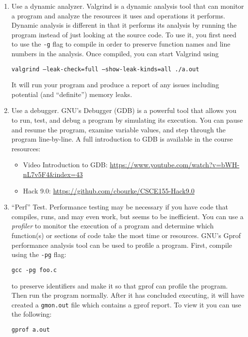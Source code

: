 \documentclass[12pt]{scrartcl}
\begin{document}
\begin{enumerate}
\begin{itemize}
  \end{itemize}
  
  \item Use a dynamic analyzer.  Valgrind is a dynamic analysis tool 
  that can monitor a program and analyze the resources it uses and
  operations it performs.  Dynamic analysis is different in that it
  performs its analysis by running the program instead of just looking
  at the source code.  To use it, you first need to use the 
  \texttt{-g} flag to compile in order to preserve function
  names and line numbers in the analysis.  Once compiled, you can start
  Valgrind using
  
  \texttt{valgrind --leak-check=full --show-leak-kinds=all ./a.out}

  It will run your program and produce a report of any issues including
  potential (and ``definite'') memory leaks.

  \item Use a debugger.  GNU's Debugger (GDB) is a powerful tool that
  allows you to run, test, and debug a program by simulating its execution.
  You can pause and resume the program, examine variable values, and
  step through the program line-by-line.  A full introduction to GDB
  is available in the course resources:
  \begin{itemize}
    \item Video Introduction to GDB: \url{https://www.youtube.com/watch?v=bWH-nL7v5F4&index=43}
    \item Hack 9.0: \url{https://github.com/cbourke/CSCE155-Hack9.0}
  \end{itemize}
  
  \item ``Perf'' Test.  Performance testing may be necessary if you have 
  code that compiles, runs, and may even work, but seems to be inefficient.
  You can use a \emph{profiler} to monitor the execution of a program
  and determine which function(s) or sections of code take the most time
  or resources.  GNU's Gprof performance analysis tool can be used to
  profile a program.  First, compile using the \texttt{-pg} flag:
  
  \texttt{gcc -pg foo.c}
  
  to preserve identifiers and make it so that gprof can profile the 
  program.  Then run the program normally.  After it has concluded 
  executing, it will have created a \texttt{gmon.out} file
  which contains a gprof report.  To view it you can use the following:
  
  \texttt{gprof a.out}
  
  
\end{enumerate}
\end{document}
